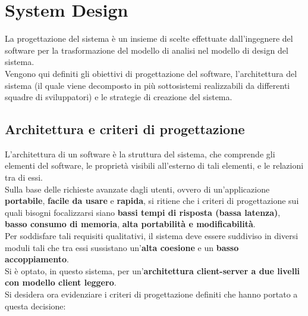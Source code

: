 
\chapter{System Design}
    La progettazione del sistema è un insieme di scelte effettuate dall'ingegnere del software per la trasformazione del modello di analisi nel modello di design del sistema. \\
    Vengono qui definiti gli obiettivi di progettazione del software, l'architettura del sistema (il quale viene decomposto in più sottosistemi realizzabili da differenti squadre di sviluppatori) e le strategie di creazione del sistema.

    \section{Architettura e criteri di progettazione}
        L'architettura di un software è la struttura del sistema, che comprende gli elementi del software, le proprietà visibili all'esterno di tali elementi, e le relazioni tra di essi. \\
        Sulla base delle richieste avanzate dagli utenti, ovvero di un’applicazione \textbf{portabile}, \textbf{facile da usare} e \textbf{rapida}, si ritiene che i criteri di progettazione sui quali bisogni focalizzarsi siano \textbf{bassi tempi di risposta (bassa latenza)}, \textbf{basso consumo di memoria}, \textbf{alta portabilità e modificabilità}. \\
        Per soddisfare tali requisiti qualitativi, il sistema deve essere suddiviso in diversi moduli tali che tra essi sussistano un'\textbf{alta coesione} e un \textbf{basso accoppiamento}. \\
        Si è optato, in questo sistema, per un'\textbf{architettura client-server a due livelli con modello client leggero}. \\
        Si desidera ora evidenziare i criteri di progettazione definiti che hanno portato a questa decisione:

